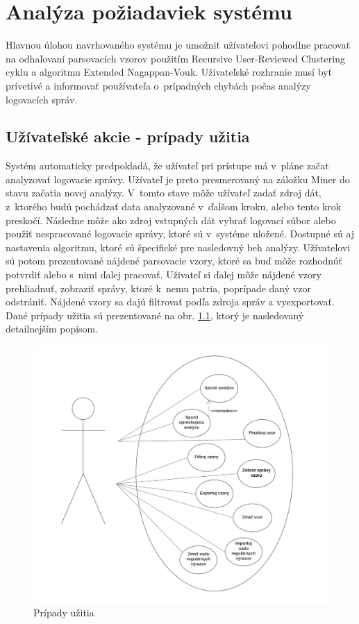 \chapter{Analýza požiadaviek systému}

Hlavnou úlohou navrhovaného systému je umožniť užívateľovi pohodlne pracovať na odhaľovaní parsovacích vzorov použitím Recursive User-Reviewed Clustering cyklu a algoritmu Extended Nagappan-Vouk. Užívateľské rozhranie musí byť prívetivé a informovať používateľa o~prípadných chybách počas analýzy logovacích správ.

\section{Užívateľské akcie - prípady užitia}

Systém automaticky predpokladá, že užívateľ pri prístupe má v~pláne začat analyzovať logovacie správy. Užívateľ je preto presmerovaný na záložku Miner do stavu začatia novej analýzy. V~tomto stave môže užívateľ zadať zdroj dát, z~ktorého budú pochádzať data analyzované v~ďalšom kroku, alebo tento krok preskočí. Následne môže ako zdroj vstupných dát vybrať logovací súbor alebo použiť nespracované logovacie správy, ktoré sú v~systéme uložené. Dostupné sú aj nastavenia algoritmu, ktoré sú špecifické pre nasledovný beh analýzy. Užívateľovi sú potom prezentované nájdené parsovacie vzory, ktoré sa buď môže rozhodnúť potvrdiť alebo s~nimi ďalej pracovať. Uživateľ si ďalej môže nájdené vzory prehliadnuť, zobraziť správy, ktoré k~nemu patria, poprípade daný vzor odstrániť. Nájdené vzory sa dajú filtrovať podľa zdroja správ a vyexportovať. Dané prípady užitia sú prezentované na obr. \ref{fig:use-cases}, ktorý je nasledovaný detailnejším popisom.

\clearpage

\begin{figure}[htbp]
 \centering 
 \begin{minipage}{0.9\linewidth}
 	\centering
 	\includegraphics[width=\textwidth]{images/thesis-use-cases.png}	
 \end{minipage}
  \caption{Prípady užitia}
  \label{fig:use-cases}
\end{figure}

